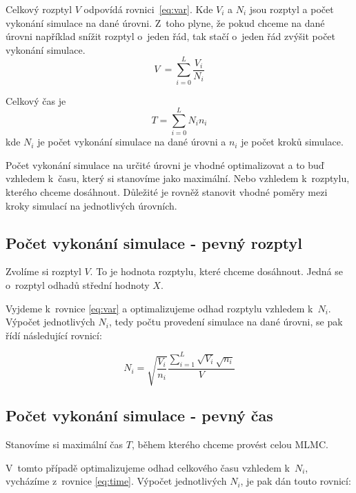 \documentclass[FM, RP]{tulthesis}
\begin{document}
Celkový rozptyl $V$ odpovídá rovnici~\ref{eq:var}. Kde $V_{i}$ a $N_{i}$ jsou rozptyl a počet vykonání simulace na dané úrovni. Z~toho plyne, že pokud chceme na dané úrovni například snížit rozptyl o~jeden řád, tak stačí o~jeden řád zvýšit počet vykonání simulace.  
\begin{equation}\label{eq:var}
V~= \sum_{i=0}^{L} \frac{V_{i}}{N_{i}}
\end{equation}

\noindent Celkový čas je \begin{equation}\label{eq:time}
T = \sum_{i=0}^{L} N_{i}n_{i}
\end{equation} kde $N_{i}$ je počet vykonání simulace na dané úrovni a $n_{i}$ je počet kroků simulace.
\newline

Počet vykonání simulace na určité úrovni je vhodné optimalizovat a to buď vzhledem k~času, který si stanovíme jako maximální. Nebo vzhledem k~rozptylu, kterého chceme dosáhnout. Důležité je rovněž stanovit vhodné poměry mezi kroky simulací na jednotlivých úrovních.
\subsection{Počet vykonání simulace - pevný rozptyl}\label{variance}

Zvolíme si rozptyl $V$. To je hodnota rozptylu, které chceme dosáhnout. Jedná se o~rozptyl odhadů střední hodnoty $X$. 


Vyjdeme k~rovnice \ref{eq:var} a optimalizujeme odhad rozptylu vzhledem k~${N}_{i}$. Výpočet jednotlivých ${N}_{i}$, tedy počtu provedení simulace na dané úrovni, se pak řídí následující rovnicí:




$$N_{i} = \sqrt{\frac{V_{i}}{n_{i}}} \frac{\sum_{i=1}^{L} \sqrt{V_{i}} \sqrt{n_{i}}}{V}$$

\subsection{Počet vykonání simulace - pevný čas} \label{time}

Stanovíme si maximální čas $T$, během kterého chceme provést celou MLMC. 

V~tomto případě optimalizujeme odhad celkového času vzhledem k~${N}_{i}$, vycházíme z~rovnice \ref{eq:time}. Výpočet jednotlivých ${N}_{i}$, je pak dán touto rovnicí:
\end{document}
